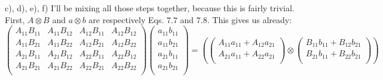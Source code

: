 \documentclass[solutions.tex]{subfiles}
\begin{document}
\hrr

c), d), e), f) I'll be mixing all those steps together, because
this is fairly trivial. First, $A\otimes B$ and $a\otimes b$ are
respectively Eqs. $7.7$ and $7.8$. This gives us already:
\[
	\begin{pmatrix}
		A_{11}B_{11} & A_{11}B_{12} & A_{12}B_{11} & A_{12}B_{12} \\
		A_{11}B_{21} & A_{11}B_{22} & A_{12}B_{21} & A_{12}B_{22} \\
		A_{21}B_{11} & A_{21}B_{12} & A_{22}B_{11} & A_{22}B_{12} \\
		A_{21}B_{21} & A_{21}B_{22} & A_{22}B_{21} & A_{22}B_{22} \\
	\end{pmatrix}\begin{pmatrix}
		a_{11}b_{11} \\
		a_{11}b_{21} \\
		a_{21}b_{11} \\
		a_{21}b_{21} \\
	\end{pmatrix} = \left(
		\begin{pmatrix}
			A_{11}a_{11}+A_{12}a_{21} \\
			A_{21}a_{11}+A_{22}a_{21} \\
		\end{pmatrix}\otimes\begin{pmatrix}
			B_{11}b_{11}+B_{12}b_{21} \\
			B_{21}b_{11}+B_{22}b_{21} \\
		\end{pmatrix}
	\right)
\]
\end{document}
